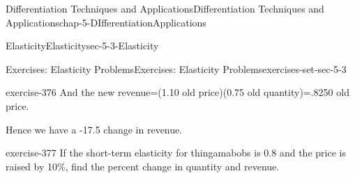 \documentclass[oneside,10pt,]{book}
\numberwithin{equation}{section}
\begin{document}
\begin{chapterptx}{Differentiation Techniques and Applications}{}{Differentiation Techniques and Applications}{}{}{chap-5-DIfferentiationApplications}
\begin{sectionptx}{Elasticity}{}{Elasticity}{}{}{sec-5-3-Elasticity}
\begin{exercises-subsection-numberless}{Exercises: Elasticity Problems}{}{Exercises: Elasticity Problems}{}{}{exercises-set-sec-5-3}
\begin{divisionexercise}{13}{}{}{exercise-376}
\hypertarget{p-2094}{}%
And the new revenue=(1.10 old price)(0.75 old quantity)=.8250 old price.%
\par
\hypertarget{p-2095}{}%
Hence we have a -17.5\textdollar{} change in revenue.%
\end{divisionexercise}%
\begin{divisionexercise}{14}{}{}{exercise-377}%
\hypertarget{p-2096}{}%
If the short-term elasticity for thingamabobs is 0.8 and the price is raised by 10\%, find the percent change in quantity and revenue.%
\end{divisionexercise}%
\end{exercises-subsection-numberless}
\end{sectionptx}
\end{chapterptx}
%
%
\typeout{************************************************}
\typeout{************************************************}
%
\end{document}
